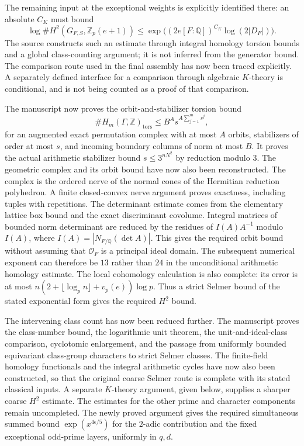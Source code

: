 \documentclass[11pt,a4paper]{article}
\theoremstyle{remark}
\newcommand{\Z}{\mathbb Z}
\newcommand{\Q}{\mathbb Q}
\newcommand{\OO}{\mathcal O}
\begin{document}
The remaining input at the exceptional weights is explicitly
identified there: an absolute $C_K$ must bound
\[
 \log\#H^2(G_{F,S},\Z_p(e+1))
       \le\exp\bigl((2e[F:\Q])^{C_K}\log(2|D_F|)\bigr).
\]
The source constructs such an estimate through integral homology
torsion bounds and a global class-counting argument; it is not
inferred from the generator bound. The comparison route used in
the final assembly has now been traced explicitly. A separately
defined interface for a comparison through algebraic $K$-theory
is conditional, and is not being counted as a proof of that
comparison.

The manuscript now proves the orbit-and-stabilizer torsion bound
\[
 \#H_m(\Gamma,\Z)_{\mathrm{tors}}
       \le B^A s^{A\sum_{j=1}^m s^j},
\]
for an augmented exact permutation complex with at most $A$
orbits, stabilizers of order at most $s$, and incoming boundary
columns of norm at most $B$. It proves the actual arithmetic
stabilizer bound $s\le3^{nN^2}$ by reduction modulo $3$.
The geometric complex and its orbit bound have now also been
reconstructed. The complex is the ordered nerve of the normal
cones of the Hermitian reduction polyhedron. A finite closed-convex
nerve argument proves exactness, including tuples with repetitions.
The determinant estimate comes from the elementary lattice box
bound and the exact discriminant covolume. Integral matrices of
bounded norm determinant are reduced by the residues of
$I(A)A^{-1}$ modulo $I(A)$, where
$I(A)=|N_{F/\Q}(\det A)|$. This gives the required orbit bound
without assuming that $\OO_F$ is a principal ideal domain.
The subsequent numerical exponent can therefore be $13$ rather
than $24$ in the unconditional arithmetic homology estimate.
The local cohomology calculation is also complete:
its error is at most
$n(2+\lfloor\log_p n\rfloor+v_p(e))\log p$.
Thus a strict Selmer bound of the stated exponential form gives
the required $H^2$ bound.

The intervening class count has now been reduced further. The
manuscript proves the class-number bound, the logarithmic unit
theorem, the unit-and-ideal-class comparison, cyclotomic enlargement,
and the passage from uniformly bounded equivariant class-group
characters to strict Selmer classes. The finite-field homology
functionals and the integral arithmetic cycles have now also been
constructed, so that the original coarse Selmer route is complete
with its stated classical inputs. A separate $K$-theory argument,
given below, supplies a sharper coarse $H^2$ estimate. The estimates for the other
prime and character components remain uncompleted.
The newly proved argument gives the required simultaneous summed
bound $\exp(x^{4\epsilon/5})$ for the $2$-adic contribution and
the fixed exceptional odd-prime layers, uniformly in $q,d$.
\end{document}
